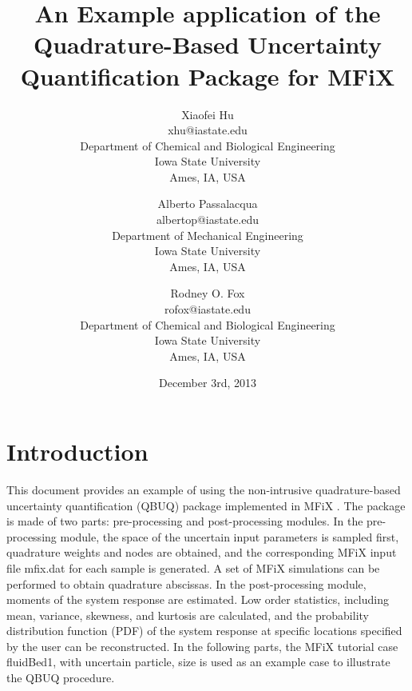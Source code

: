 \documentclass[a4paper,12pt,titlepage]{article}
\newcommand{\MFIX}{MFiX }
\begin{document}
\begin{titlepage}
\title{An Example application of the Quadrature-Based Uncertainty Quantification
Package for \MFIX}

\author{Xiaofei Hu \\ 
        xhu@iastate.edu \\
        Department of Chemical and Biological Engineering \\
        Iowa State University \\
        Ames, IA, USA \\
        \and
        Alberto Passalacqua \\
        albertop@iastate.edu \\
        Department of Mechanical  Engineering \\
        Iowa State University \\
        Ames, IA, USA \\
        \and
        Rodney O. Fox \\
        rofox@iastate.edu \\
        Department of Chemical and Biological Engineering \\
        Iowa State University \\
        Ames, IA, USA}
\date{December 3rd, 2013}
\maketitle
\end{titlepage}

\section{Introduction}
\label{sec:Introduction}
This document provides an example of using the non-intrusive quadrature-based
uncertainty quantification (QBUQ) package implemented in \MFIX. The package is
made of two parts: pre-processing and post-processing modules. In the
pre-processing module, the space of the uncertain input parameters is sampled
first, quadrature weights and nodes are obtained, and the corresponding \MFIX
input file mfix.dat for each sample is generated. A set of \MFIX simulations can
be performed to obtain quadrature abscissas. In the post-processing module,
moments of the system response are estimated. Low order statistics, including
mean, variance, skewness, and kurtosis are calculated, and the probability
distribution function (PDF) of the system response at specific locations
specified by the user can be reconstructed. In the following parts, the \MFIX
tutorial case fluidBed1, with uncertain particle, size is used as an example
case to illustrate the QBUQ procedure.
\end{document}
